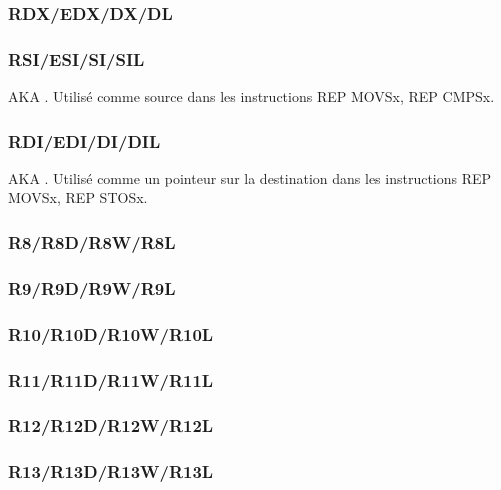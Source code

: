 \subsubsection{RDX/EDX/DX/DL}

\subsubsection{RSI/ESI/SI/SIL}

\ac{AKA} . Utilisé comme source dans les instructions
REP MOVSx, REP CMPSx.

\subsubsection{RDI/EDI/DI/DIL}

\ac{AKA} . Utilisé comme un pointeur sur la destination dans
les instructions REP MOVSx, REP STOSx.

\subsubsection{R8/R8D/R8W/R8L}

\subsubsection{R9/R9D/R9W/R9L}

\subsubsection{R10/R10D/R10W/R10L}

\subsubsection{R11/R11D/R11W/R11L}

\subsubsection{R12/R12D/R12W/R12L}

\subsubsection{R13/R13D/R13W/R13L}

